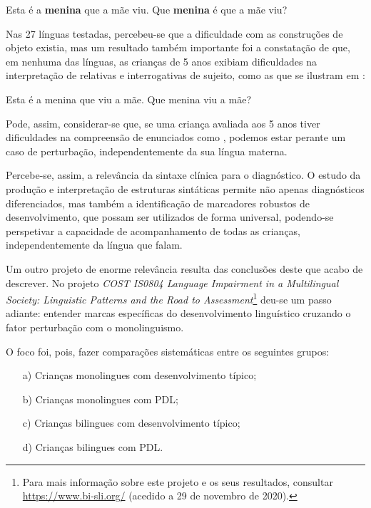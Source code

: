 \documentclass[output=paper,colorlinks,citecolor=brown,booklanguage=portuguese]{langscibook}
\begin{document}
\ea\label{ex:cap2ex33} 
    \ea Esta é a \textbf{menina} que a mãe viu.
    \ex Que \textbf{menina} é que a mãe viu?
    \z
\z

Nas 27 línguas testadas, percebeu-se que a dificuldade com as construções de objeto existia, mas um resultado também importante foi a constatação de que, em nenhuma das línguas, as crianças de 5 anos exibiam dificuldades na interpretação de relativas e interrogativas de sujeito, como as que se ilustram em :

\ea\label{ex:cap2ex34}
        \ea Esta é a menina que viu a mãe.
        \ex Que menina viu a mãe?
    \z
\z

Pode, assim, considerar-se que, se uma criança avaliada aos 5 anos tiver dificuldades na compreensão de enunciados como , podemos estar perante um caso de perturbação, independentemente da sua língua materna.

Percebe-se, assim, a relevância da sintaxe clínica para o diagnóstico. O estudo da produção e interpretação de estruturas sintáticas permite não apenas diagnósticos diferenciados, mas também a identificação de marcadores robustos de desenvolvimento, que possam ser utilizados de forma universal, podendo-se perspetivar a capacidade de acompanhamento de todas as crianças, independentemente da língua que falam.

Um outro projeto de enorme relevância resulta das conclusões deste que acabo de descrever. No projeto \emph{COST IS0804 Language Impairment in a Multilingual Society: Linguistic Patterns and the  Road to Assessment}\footnote{Para mais informação sobre este projeto e os seus resultados, consultar \url{https://www.bi-sli.org/} (acedido a 29 de novembro de 2020).} deu-se um passo adiante: entender marcas específicas do desenvolvimento linguístico cruzando o fator perturbação com o monolinguismo.

O foco foi, pois, fazer comparações sistemáticas entre os seguintes grupos:

\begin{enumerate}
    \item [a)] Crianças monolingues com desenvolvimento típico;
    \item[b)] Crianças monolingues com PDL;
    \item[c)] Crianças bilingues com desenvolvimento típico;
    \item[d)] Crianças bilingues com PDL.
\end{enumerate}
\end{document}
